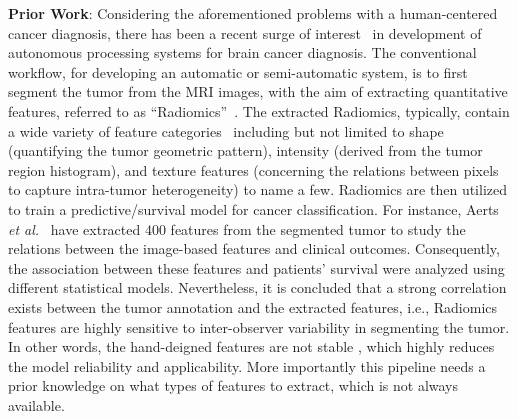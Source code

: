 \documentclass{article}
\begin{document}
\vspace{.025in}
\noindent
\textbf{Prior Work}:
Considering the aforementioned problems with a human-centered cancer diagnosis, there has been a recent surge of interest~\cite{Usman:2017,Abbadi:2017,Reema:2017,Mohsen:2018} in development of autonomous processing systems for brain cancer diagnosis. The conventional workflow, for developing an automatic or semi-automatic system, is to first segment the tumor from the MRI images, with the aim of extracting quantitative features, referred to as ``Radiomics''~\cite{Parnian:SPM18}. The extracted Radiomics, typically, contain a wide variety of feature categories~\cite{Oikonomou:2018} including but not limited to shape (quantifying the tumor geometric pattern), intensity (derived from the tumor region histogram), and texture features (concerning the relations between pixels to capture intra-tumor heterogeneity) to name a few. Radiomics are then utilized to train a predictive/survival model for cancer classification. For instance, Aerts \textit{et al.}~\cite{Aerts:2014} have extracted $400$ features from the segmented tumor to study the relations between the image-based features and clinical outcomes. Consequently, the association between these features and patients' survival were analyzed using different statistical models. Nevertheless, it is concluded that a strong correlation exists between the tumor annotation and the extracted features, i.e., Radiomics features are highly sensitive to inter-observer variability in segmenting the tumor. In other words, the hand-deigned features are not stable \cite{Griethuysen:2017}, which highly reduces the model reliability and applicability. More importantly this pipeline needs a prior knowledge on what types of features to extract, which is not always available.
\end{document}
